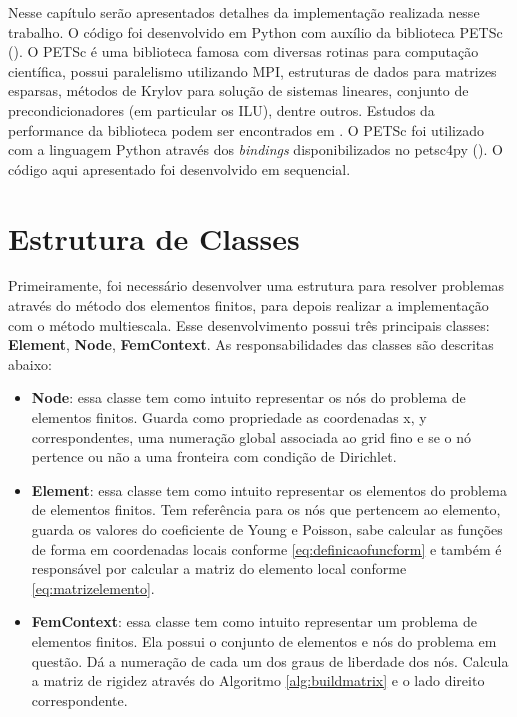 Nesse capítulo serão apresentados detalhes da implementação realizada nesse trabalho. O código foi desenvolvido em Python com auxílio da biblioteca PETSc (\citet{petsc-user-ref}). O PETSc é uma biblioteca famosa com diversas rotinas para computação científica, possui paralelismo utilizando MPI, estruturas de dados para matrizes esparsas, métodos de Krylov para solução de sistemas lineares, conjunto de precondicionadores (em particular os ILU), dentre outros. Estudos da performance da biblioteca podem ser encontrados em \citet{petsc-efficient}. O PETSc foi utilizado com a linguagem Python através dos \textit{bindings} disponibilizados no petsc4py (\citet{Dalcin2011}). O código aqui apresentado foi desenvolvido em sequencial. 


\section{Estrutura de Classes}

Primeiramente, foi necessário desenvolver uma estrutura para resolver problemas através do método dos elementos finitos, para depois realizar a implementação com o método multiescala. Esse desenvolvimento possui três principais classes: \textbf{Element}, \textbf{Node}, \textbf{FemContext}. As responsabilidades das classes são descritas abaixo:

\begin{itemize}
    \item \textbf{Node}: essa classe tem como intuito representar os nós do problema de elementos finitos. Guarda como propriedade as coordenadas x, y correspondentes, uma numeração global associada ao grid fino e se o nó pertence ou não a uma fronteira com condição de Dirichlet.
    \item \textbf{Element}: essa classe tem como intuito representar os elementos do problema de elementos finitos. Tem referência para os nós que pertencem ao elemento, guarda os valores do coeficiente de Young e Poisson, sabe calcular as funções de forma em coordenadas locais conforme \eqref{eq:definicaofuncform} e também é responsável por calcular a matriz do elemento local conforme \eqref{eq:matrizelemento}.
    \item \textbf{FemContext}: essa classe tem como intuito representar um problema de elementos finitos. Ela possui o conjunto de elementos e nós do problema em questão. Dá a numeração de cada um dos graus de liberdade dos nós. Calcula a matriz de rigidez através do Algoritmo \ref{alg:buildmatrix} e o lado direito correspondente. 
\end{itemize}

